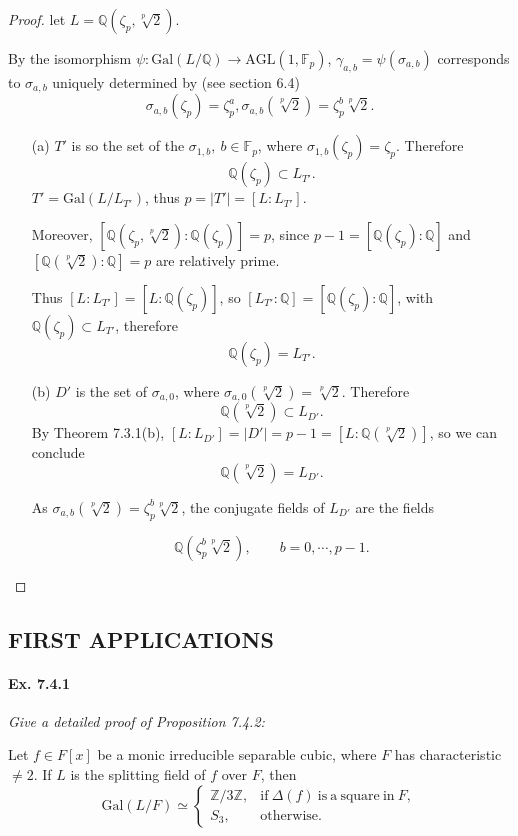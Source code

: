 \documentclass[11pt,a4paper]{article}
\newcommand{\Q}{\mathbb{Q}}
\newcommand{\Z}{\mathbb{Z}}
\newcommand{\F}{\mathbb{F}}
\newcommand{\Gal}{\mathrm{Gal}}
\begin{document}
\begin{proof}
let $L = \Q(\zeta_p,\sqrt[p]{2})$.

By the isomorphism $\psi : \Gal(L/\Q) \to \mathrm{AGL}(1,\F_p)$, $\gamma_{a,b} = \psi(\sigma_{a,b})$ corresponds to $\sigma_{a,b}$ uniquely determined by (see section 6.4)
$$\sigma_{a,b}(\zeta_p) = \zeta_p^a, \sigma_{a,b}(\sqrt[p]{2}) = \zeta_p^b \sqrt[p]{2}.$$
\begin{enumerate}
\item[(a)]
$T'$ is so the set of the $\sigma_{1,b},\  b \in \F_p$, where $\sigma_{1,b}(\zeta_p) = \zeta_p$. Therefore $$ \Q(\zeta_p) \subset L_{T'}.$$
 $T' = \Gal(L/L_{T'})$, thus $p = \vert T' \vert = [L:L_{T'}]$.
 
Moreover, $[\Q(\zeta_p, \sqrt[p]{2}):\Q(\zeta_p)] = p$, since $p-1 = [\Q(\zeta_p) : \Q]$ and $[\Q(\sqrt[p]{2}):\Q] = p$ are relatively prime.

Thus $[L:L_{T'}] = [L:\Q(\zeta_p)]$, so $[L_{T'}:\Q] = [\Q(\zeta_p):\Q]$, with $ \Q(\zeta_p) \subset L_{T'}$, therefore
$$ \Q(\zeta_p) = L_{T'}.$$

\item[(b)]
$D'$ is the set of $\sigma_{a,0}$, where $\sigma_{a,0}(\sqrt[p]{2}) =  \sqrt[p]{2}$. Therefore
$$\Q(\sqrt[p]{2}) \subset L_{D'}.$$
By Theorem 7.3.1(b), $[L:L_{D'}] = \vert D' \vert = p-1 = [L : \Q(\sqrt[p]{2})]$, so we can conclude
$$\Q(\sqrt[p]{2}) = L_{D'}.$$

As $\sigma_{a,b} (\sqrt[p]{2}) = \zeta_p^b \sqrt[p]{2}$, the conjugate fields of $L_{D'}$ are the fields 

$$ \Q(\zeta_p^b\sqrt[p]{2}),\qquad b=0,\cdots,p-1.$$
\end{enumerate}
\end{proof}

\subsection{FIRST APPLICATIONS}

\paragraph{Ex. 7.4.1}

{\it Give a detailed proof of Proposition 7.4.2:

Let $f\in F[x]$ be a monic irreducible separable cubic, where $F$ has characteristic $\ne 2$. If $L$ is the splitting field of $f$ over $F$, then
$$
\Gal(L/F) \simeq 
\left\{
\begin{array}{ll}
 \Z/3\Z, &   \mathrm{if}\ \Delta(f)\ \mathrm{is}\  \mathrm{a}\  \mathrm{square}\  \mathrm{in} \ F,   \\
  S_3,&        \mathrm{otherwise.}
\end{array}
\right.
$$
}
\end{document}
